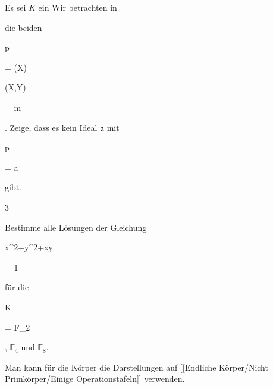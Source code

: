 {


Es sei $K$ ein
Wir betrachten in


 die beiden


\mavergleichskettedisp


{\vergleichskette


{ {\mathfrak p}
}


{ =} { (X)
}


{ \subset} { (X,Y)
}


{ =} { {\mathfrak m}
}


{ } {
}


}
{}{}{.}
Zeige, dass es kein Ideal ${\mathfrak a}$ mit


\mavergleichskettedisp


{\vergleichskette


{ {\mathfrak p}
}


{ =} { {\mathfrak a} 
}


{ } {
}


{ } {
}


{ } {
}


}
{}{}{}
gibt.


}


{} {}






{3}


{


Bestimme alle Lösungen der Gleichung


\mavergleichskettedisp


{\vergleichskette


{ x^2+y^2+xy
}


{ =} { 1
}


{ } {
}


{ } {
}


{ } {
}


}
{}{}{}
für die


\mavergleichskette


{\vergleichskette


{ K
}


{ = }{ \mathbb F_2
}


{  }{
}


{    }{
}


{   }{
}


}
{}{}{,}
$\mathbb F_4$ und $\mathbb F_8$.

Man kann für die Körper die Darstellungen auf [[Endliche Körper/Nicht Primkörper/Einige Operationstafeln]] verwenden.


}


